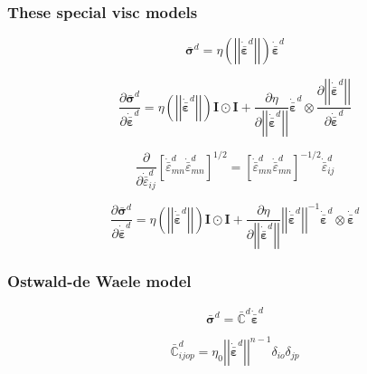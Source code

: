 \documentclass[12pt]{article}
\newcommand{\pder}[2]{\dfrac{\partial #1}{\partial #2}}
\begin{document}
\subsubsection{These special visc models}

\begin{equation}
	\bar{\bm{\sigma}}^{d} = \eta\left(\left|\left|\dot{\bar{\bm{\varepsilon}}}^{d}\right| \right|\right)\dot{\bar{\bm{\varepsilon}}}^{d}
\end{equation}

\begin{equation}
	\pder{\bar{\bm{\sigma}}^{d}}{\dot{\bar{\bm{\varepsilon}}}^{d}}= \eta\left(\left|\left|\dot{\bar{\bm{\varepsilon}}}^{d}\right| \right|\right) \bm{I}\odot\bm{I} +\pder{\eta}{\left|\left|\dot{\bar{\bm{\varepsilon}}}^{d}\right| \right|} \dot{\bar{\bm{\varepsilon}}}^{d} \otimes \pder{\left|\left|\dot{\bar{\bm{\varepsilon}}}^{d}\right| \right|}{\dot{\bar{\bm{\varepsilon}}}^{d} }
\end{equation}

\begin{equation}
	\pder{}{\dot{\bar{\varepsilon}}^{d}_{ij}}\left[\dot{\bar{\varepsilon}}^{d}_{mn}\dot{\bar{\varepsilon}}^{d}_{mn}\right]^{1/2} = \left[\dot{\bar{\varepsilon}}^{d}_{mn}\dot{\bar{\varepsilon}}^{d}_{mn}\right]^{-1/2} \dot{\bar{\varepsilon}}^{d}_{ij}
\end{equation}


\begin{equation}
\pder{\bar{\bm{\sigma}}^{d}}{\dot{\bar{\bm{\varepsilon}}}^{d}}= \eta\left(\left|\left|\dot{\bar{\bm{\varepsilon}}}^{d}\right| \right|\right) \bm{I}\odot\bm{I} +\pder{\eta}{\left|\left|\dot{\bar{\bm{\varepsilon}}}^{d}\right| \right|} \left|\left|\dot{\bar{\bm{\varepsilon}}}^{d}\right| \right|^{-1}\dot{\bar{\bm{\varepsilon}}}^{d} \otimes \dot{\bar{\bm{\varepsilon}}}^{d}
\end{equation}

\subsubsection{Ostwald-de Waele model}

\begin{equation}
	\bar{\bm{\sigma}}^{d} = \bar{\mathbb{C}}^{d}\dot{\bar{\bm{\varepsilon}}}^{d}
\end{equation}

\begin{equation}
	 \bar{\mathbb{C}}^{d}_{ijop} = \eta_{0} \left|\left|\dot{\bar{\bm{\varepsilon}}}^{d}\right|\right|^{n-1} \delta_{io}\delta_{jp}
\end{equation}
\end{document}
